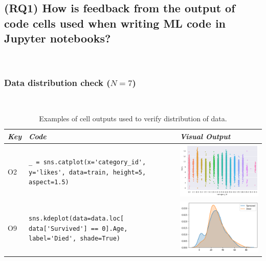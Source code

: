 \subsection{(RQ1) How is feedback from the output of code cells used when writing ML code in Jupyter notebooks?}~\label{sec:result-rq1}

\subsubsection{Data distribution check ($N = 7$)}~\label{sec:data-distribution-output}

\begin{table}
  \centering
  \caption{Examples of cell outputs used to verify distribution of data.}
  \begin{tabular}{@{}m{} m{} m{}@{}}
    \toprule
    \emph{\textbf{Key}}&
    \emph{\textbf{Code}}&
    \emph{\textbf{Visual Output}}\\
    \midrule

    O2&
    \lstinline[]$_ = sns.catplot(x='category_id', y='likes', data=train, height=5, aspect=1.5)$&
    \includegraphics[width=\linewidth]{distribution-check-catplot.png}\\

    O9&
    \lstinline[]$sns.kdeplot(data=data.loc[ data['Survived'] == 0].Age, label='Died', shade=True)$&
    \includegraphics[width=\linewidth]{distribution-check-kdeplot.png}\\


\end{tabular}
\end{table}
